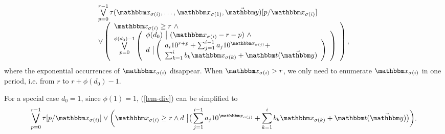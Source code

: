 \begin{equation}\label{lem-div}
\begin{array}{l}
\bigvee \limits_{p=0}^{r-1} \tau(\ivarx_{\sigma(i)}, \ldots, \ivarx_{\sigma(1)}, \vec{\ivary})[p/\ivarx_{\sigma(i)}]\\
\vee
\left(
\begin{array}{l}
\ivarx_{\sigma(i)} \ge r\ \wedge \\
\bigvee \limits_{p = 0}^{\phi(d_0)-1} 
\left(
\begin{array}{l}
\phi(d_0)\ \big \vert \ (\ivarx_{\sigma(i)} - r - p)\ \wedge \\
d\ \big \vert  
\left(
\begin{array}{l}
a_i 10^{r+p} + \sum_{j=1}^{i-1} a_j 10^{\ivarx_{\sigma(j)}} + \\
\sum_{k=1}^{i} b_k \ivarx_{\sigma(k)} + \iterm(\vec{\ivary})
\end{array}
\right) 
\end{array}
\right)
\end{array}
\right),
\end{array}
\end{equation}
where the exponential occurrences of $\ivarx_{\sigma(i)}$ disappear. When $\ivarx_{\sigma(i)}>r$, we only need to enumerate $\ivarx_{\sigma(i)}$ in one period, i.e. from $r$ to $r+\phi(d_0)-1$.


For a special case $d_0 = 1$, since $\phi(1)=1$, (\ref{lem-div}) can be simplified to 
$$\begin{aligned}
    \bigvee_{p=0}^{r-1} \tau [p/\ivarx_{\sigma(i)}] \vee  \bigg(\ivarx_{\sigma(i)}\ge r \wedge d\ \big \vert \big(\sum_{j=1}^{i-1} a_j 10^{\ivarx_{\sigma(j)}} + \sum_{k=1}^{i} b_k \ivarx_{\sigma(k)} 
    + \iterm(\vec{\ivary}) \big)\bigg)
\end{aligned}.$$





